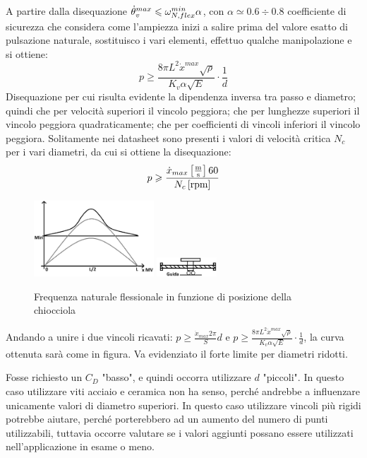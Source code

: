 A partire dalla disequazione \( \dot{\theta}_v^{max} \leqslant \omega_{N,flex}^{min} \alpha \), con \( \alpha \simeq 0.6\div 0.8 \) coefficiente di sicurezza che considera come l'ampiezza inizi a salire prima del valore esatto di pulsazione naturale, sostituisco i vari elementi, effettuo qualche manipolazione e si ottiene:
\[ p \geqslant \frac{8\pi L^2 \dot{x}^{max} \sqrt{\rho}}{K_v \alpha \sqrt{E}} \cdot \frac{1}{d} \]
Disequazione per cui risulta evidente la dipendenza inversa tra passo e diametro; quindi che per velocità superiori il vincolo peggiora; che per lunghezze superiori il vincolo peggiora quadraticamente; che per coefficienti di vincoli inferiori il vincolo peggiora.
Solitamente nei datasheet sono presenti i valori di velocità critica \(N_c\) per i vari diametri, da cui si ottiene la disequazione:
\[ p \geqslant \frac{\dot{x}_{max} \left[\frac{\text{m}}{\text{s}}\right] 60 }{N_c \left[\text{rpm} \right] } \]

\begin{figure}[h]
    \centering
    \includegraphics[width=0.4\textwidth]{Immagini/vel_critica_vite_2sol.png}
    \includegraphics[width=0.2\textwidth]{Immagini/vite_guida_MV.png}
    \caption{Frequenza naturale flessionale in funzione di posizione della chiocciola}
\end{figure}

Andando a unire i due vincoli ricavati: \(p \geqslant \frac{\dot{x}_{max} 2\pi }{S} d\) e \( p \geqslant \frac{8\pi L^2 \dot{x}^{max} \sqrt{\rho}}{K_v \alpha \sqrt{E}} \cdot \frac{1}{d} \), la curva ottenuta sarà come in figura. Va evidenziato il forte limite per diametri ridotti.

Fosse richiesto un \( C_D \) "basso", e quindi occorra utilizzare \(d\) "piccoli". In questo caso utilizzare viti acciaio e ceramica non ha senso, perché andrebbe a influenzare unicamente valori di diametro superiori. In questo caso utilizzare vincoli più rigidi potrebbe aiutare, perché porterebbero ad un aumento del numero di punti utilizzabili, tuttavia occorre valutare se i valori aggiunti possano essere utilizzati nell'applicazione in esame o meno.

